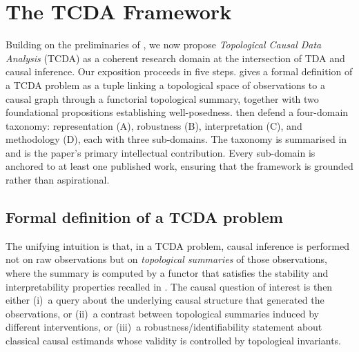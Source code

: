 \section{The TCDA Framework}\label{sec:framework}

Building on the preliminaries of , we now propose
\emph{Topological Causal Data Analysis} (TCDA) as a coherent research
domain at the intersection of TDA and causal inference. Our exposition
proceeds in five steps.  gives a formal definition
of a TCDA problem as a tuple linking a topological space of observations
to a causal graph through a functorial topological summary, together with
two foundational propositions establishing well-posedness.
 then defend a
four-domain taxonomy: representation (A), robustness (B), interpretation
(C), and methodology (D), each with three sub-domains. The taxonomy is
summarised in  and is the paper's primary intellectual
contribution. Every sub-domain is anchored to at least one published
work, ensuring that the framework is grounded rather than aspirational.

\subsection{Formal definition of a TCDA problem}\label{sec:formal-tcda}

The unifying intuition is that, in a TCDA problem, causal inference is
performed not on raw observations but on \emph{topological summaries} of
those observations, where the summary is computed by a functor that
satisfies the stability and interpretability properties recalled in
. The causal question of interest is then either
(i)~a query about the underlying causal structure that generated the
observations, or (ii)~a contrast between topological summaries induced
by different interventions, or (iii)~a robustness/identifiability
statement about classical causal estimands whose validity is controlled
by topological invariants.

